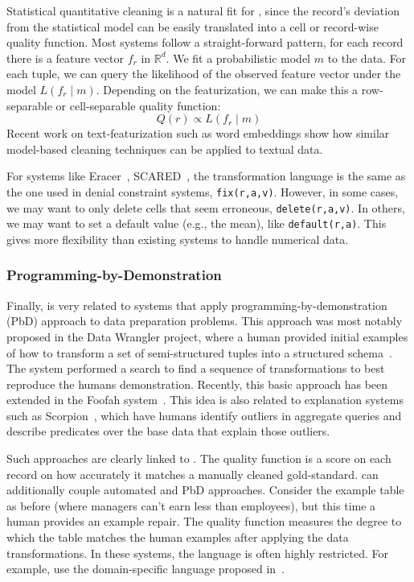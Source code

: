 Statistical quantitative cleaning is a natural fit for \sys, since the record's deviation from the statistical model can be easily translated into a cell or record-wise quality function.  
Most systems follow a straight-forward pattern, for each record there is a feature vector $f_r$ in $\mathbb{R}^d$.
We fit a probabilistic model $m$ to the data.
For each tuple, we can query the likelihood of the observed feature vector under the model $L(f_r \mid m)$.
Depending on the featurization, we can make this a row-separable or cell-separable quality function:
\[
Q(r) \propto L(f_r \mid m)
\]
Recent work on text-featurization such as word embeddings show how similar model-based cleaning techniques can be applied to textual data.  

For systems like Eracer~\cite{eracer}, SCARED~\cite{yakout2013don}, the transformation language is the same as the one used in denial constraint systems, \texttt{fix(r,a,v)}.
However, in some cases, we may want to only delete cells that seem erroneous, \texttt{delete(r,a,v)}.
In others, we may want to set a default value (e.g., the mean), like \texttt{default(r,a)}.
This gives \sys more flexibility than existing systems to handle numerical data.

  
\subsubsection{Programming-by-Demonstration}
Finally, \sys is very related to systems that apply programming-by-demonstration (PbD) approach to data preparation problems.
This approach was most notably proposed in the Data Wrangler project, where a human provided initial examples of how to transform a set of semi-structured tuples into a structured schema~\cite{wrangler,trifacta}.
The system performed a search to find a sequence of transformations to best reproduce the humans demonstration.
Recently, this basic approach has been extended in the Foofah system~\cite{jin2017foofah}.
This idea is also related to explanation systems such as Scorpion~\cite{DBLP:journals/pvldb/0002M13}, which have humans identify outliers in aggregate queries and describe predicates over the base data that explain those outliers.

Such approaches are clearly linked to \sys. The quality function is a score on each record on how accurately it matches a manually cleaned gold-standard. \sys can additionally couple automated and PbD approaches. 
Consider the example table as before (where managers can't earn less than employees), but this time  a human provides an example repair.
The quality function measures the degree to which the table matches the human examples after applying the data transformations.
In these systems, the language is often highly restricted.
For example, \cite{wrangler, jin2017foofah} use the domain-specific language proposed in~\cite{raman2001potter}.




